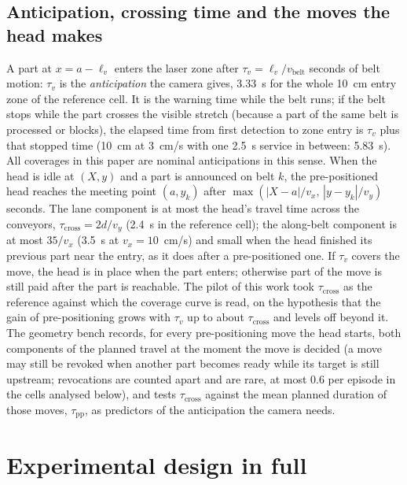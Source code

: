 \documentclass[11pt,a4paper]{article}
\newcommand{\tcross}{\tau_{\mathrm{cross}}}
\newcommand{\tpp}{\tau_{\mathrm{pp}}}
\newcommand{\tv}{\tau_{v}}
\newcommand{\lv}{\ell_{v}}
\newcommand{\vb}{v_{\mathrm{belt}}}
\begin{document}
\subsection{Anticipation, crossing time and the moves the head makes}\label{sup:anticipation}
A part at $x=a-\lv$ enters the laser zone after $\tv=\lv/\vb$ seconds of belt motion:
$\tv$ is the \emph{anticipation} the camera gives, 3.33~s for the whole 10~cm entry zone of
the reference cell. It is the warning time while the belt runs; if the belt stops while the
part crosses the visible stretch (because a part of the same belt is processed or blocks),
the elapsed time from first detection to zone entry is $\tv$ plus that stopped time (10~cm
at 3~cm/s with one 2.5~s service in between: 5.83~s). All coverages in this paper are
nominal anticipations in this sense. When the head is idle at $(X,y)$ and a part is announced on belt $k$, the
pre-positioned head reaches the meeting point $(a,y_k)$ after
$\max(|X-a|/v_x,\,|y-y_k|/v_y)$ seconds. The lane component is at most the head's
travel time across the conveyors, $\tcross=2d/v_y$ (2.4~s in the reference cell); the
along-belt component is at most $35/v_x$ (3.5~s at $v_x=10$~cm/s) and small when the
head finished its previous part near the entry, as it does after a pre-positioned one.
If $\tv$ covers the move, the head is in place when the part enters; otherwise part of
the move is still paid after the part is reachable. The pilot of this work took
$\tcross$ as the reference against which the coverage curve is read, on the hypothesis
that the gain of pre-positioning grows with $\tv$ up to about $\tcross$ and levels off
beyond it. The geometry bench records, for every pre-positioning move the head starts, both
components of the planned travel at the moment the move is decided (a move may still be
revoked when another part becomes ready while its target is still upstream; revocations
are counted apart and are rare, at most
0.6 per episode in the cells analysed below), and tests $\tcross$ against the mean planned
duration of those moves, $\tpp$, as predictors of the anticipation the camera needs.

\section{Experimental design in full}\label{sup:design}
\end{document}
